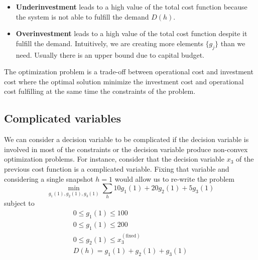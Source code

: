 \begin{itemize}
    \item \textbf{Underinvestment} leads to a high value of the total cost function because the system is not able to fulfill the demand $D(h)$.
    \item \textbf{Overinvestment} leads to a high value of the total cost function despite it fulfill the demand. Intuitively, we are creating more elements $\{g_{j}\}$ than we need. Usually there is an upper bound due to capital budget.
\end{itemize}
The optimization problem is a trade-off between operational cost and investment cost where the optimal solution minimize the investment cost and operational cost fulfilling at the same time the constraints of the problem.
\subsection{Complicated variables}
We can consider a decision variable to be complicated if the decision variable is involved in most of the constraints or the decision variable produce non-convex optimization problems. For instance, consider that the decision variable $x_{3}$ of the previous cost function is a complicated variable. Fixing that variable and considering a single snapshot $h=1$ would allow us to re-write the problem 
\begin{equation}
    \min_{g_{1}(1), g_{2}(1), g_{3}(1)} \sum_{h}10g_{1}(1)+20g_{2}(1) + 5g_{3}(1)
\end{equation}
subject to
\begin{align}
    0 \leq g_{1}(1) \leq 100 \\
    0 \leq g_{1}(1) \leq 200 \\
    0 \leq g_{2}(1) \leq x_{3}^{(\text{fixed})} \\
    D(h) = g_{1}(1) + g_{2}(1) + g_{3}(1)
\end{align}
